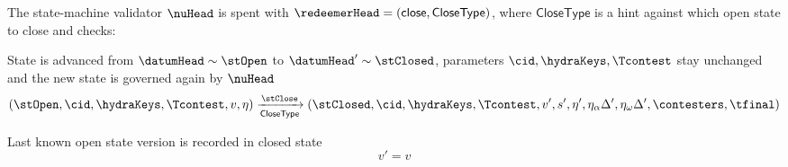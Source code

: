 \noindent The state-machine validator $\nuHead$ is spent with
$\redeemerHead = (\mathsf{close}, \mathsf{CloseType})$, where
$\mathsf{CloseType}$ is a hint against which open state to close and checks:
\begin{menumerate}
  \item State is advanced from $\datumHead \sim \stOpen$ to
  $\datumHead' \sim \stClosed$, parameters $\cid,\hydraKeys,\Tcontest$
  stay unchanged and the new state is governed again by $\nuHead$
  \[
	(\stOpen,\cid,\hydraKeys,\Tcontest,v,\eta) \xrightarrow[\mathsf{CloseType}]{\stClose} (\stClosed,\cid,\hydraKeys,\Tcontest,v',s',\eta', \eta_\alpha\Delta', \eta_\omega\Delta', \contesters,\tfinal)
  \]
  \item Last known open state version is recorded in closed state
  \[
	v' = v
  \]


\end{menumerate}
